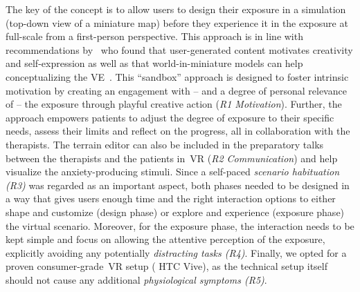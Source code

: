 The key of the concept is to allow users to design their exposure in a simulation (top-down view of a miniature map) before they experience it in the exposure at full-scale from a first-person perspective. This approach is in line with recommendations by~\citeauthor{mine2003} who found that user-generated content motivates creativity and self-expression as well as that world-in-miniature models can help conceptualizing the \ac{VE}~\cite{mine2003}.
This ``sandbox'' approach is designed to foster intrinsic motivation by creating an engagement with -- and a degree of personal relevance of -- the exposure through playful creative action (\textit{R1 Motivation}). Further, the approach empowers patients to adjust the degree of exposure to their specific needs, assess their limits and reflect on the progress, all in collaboration with the therapists. The terrain editor can also be included in the preparatory talks between the therapists and the patients in~\ac{VR} (\textit{R2 Communication}) and help visualize the anxiety-producing stimuli. Since a self-paced \textit{scenario habituation (R3)} was regarded as an important aspect, both phases needed to be designed in a way that gives users enough time and the right interaction options to either shape and customize (design phase) or explore and experience (exposure phase) the virtual scenario. Moreover, for the exposure phase, the interaction needs to be kept simple and focus on allowing the attentive perception of the exposure, explicitly avoiding any potentially \textit{distracting tasks (R4)}. Finally, we opted for a proven consumer-grade~\ac{VR} setup (%
HTC Vive), as the technical setup itself should not cause any additional \textit{physiological symptoms (R5)}.

